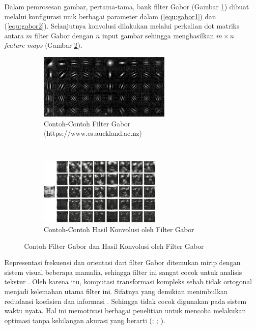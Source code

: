 Dalam pemrosesan gambar, pertama-tama, bank filter Gabor (Gambar \ref{fig:contohfiltergabor}) dibuat melalui konfigurasi unik berbagai parameter dalam (\ref{equ:gabor1}) dan (\ref{equ:gabor2}). Selanjutnya konvolusi dilakukan melalui perkalian dot matriks antara $m$ filter Gabor dengan $n$ input gambar sehingga menghasilkan $m \times n$ \textit{feature maps} (Gambar \ref{fig:contohkonvolusigabor}).
\begin{figure}
    \centering
    \begin{subfigure}[t]{6.5cm}
        \includegraphics[width=6.5cm]{gambar/filter2_gabor.png}
        \caption[Contoh-Contoh Filter Gabor]{Contoh-Contoh Filter Gabor\\(https://www.cs.auckland.ac.nz)}
        \label{fig:contohfiltergabor}
    \end{subfigure}
    ~~~
    \begin{subfigure}[t]{6cm}
        \includegraphics[width=6cm]{gambar/hasil_filter2_gabor.jpg}
        \caption[Contoh-Contoh Hasil Konvolusi oleh Filter Gabor]{Contoh-Contoh Hasil Konvolusi oleh Filter Gabor \protect{}}
        \label{fig:contohkonvolusigabor}
    \end{subfigure}
    \caption{Contoh Filter Gabor dan Hasil Konvolusi oleh Filter Gabor}
    \label{fig:konvolusigabor}
\end{figure}

Representasi frekuensi dan orientasi dari filter Gabor ditemukan mirip dengan sistem visual beberapa mamalia, sehingga filter ini sangat cocok untuk analisis tekstur . Oleh karena itu, komputasi transformasi kompleks sebab tidak ortogonal menjadi kelemahan utama filter ini. Sifatnya yang demikian menimbulkan redudansi koefisien dan informasi . Sehingga tidak cocok digunakan pada sistem waktu nyata. Hal ini memotivasi berbagai penelitian untuk mencoba melakukan optimasi tanpa kehilangan akurasi yang berarti (; ; ).

